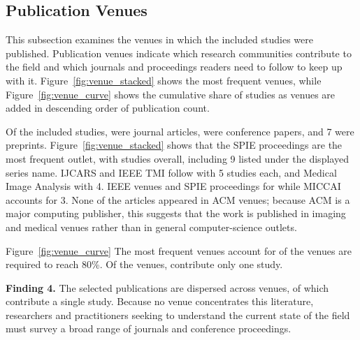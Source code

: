 






\subsection{Publication Venues}
\label{subsec:venues}

This subsection examines the venues in which the included studies were published. Publication venues indicate which research communities contribute to the field and which journals and proceedings readers need to follow to keep up with it. Figure~\ref{fig:venue_stacked} shows the most frequent venues, while Figure~\ref{fig:venue_curve} shows the cumulative share of studies as venues are added in descending order of publication count.

Of the  included studies,   were journal articles,   were conference papers, and 7  were preprints. Figure~\ref{fig:venue_stacked} shows that the SPIE proceedings are the most frequent outlet, with  studies overall, including 9 listed under the displayed series name. IJCARS and IEEE TMI follow with 5 studies each, and Medical Image Analysis with 4. IEEE venues  and SPIE proceedings for  while MICCAI accounts for 3. None of the articles appeared in ACM venues; because ACM is a major computing publisher, this suggests that the work is published in imaging and medical venues rather than in general computer-science outlets.

Figure~\ref{fig:venue_curve}  The  most frequent venues account for  of the   venues are required to reach 80\%. Of the  venues,  contribute only one study.

\vspace{0.25cm}
\begin{mdframed}[linewidth=0.5pt, linecolor=black, backgroundcolor=blue!10]
\textbf{Finding 4.} The selected  publications are dispersed across  venues,  of which contribute a single study. Because no venue concentrates this literature, researchers and practitioners seeking to understand the current state of the field must survey a broad range of journals and conference proceedings.
\end{mdframed}
\vspace{0.25cm}

